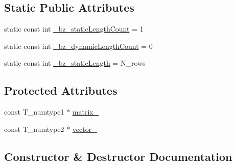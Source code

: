 \subsection*{Static Public Attributes}
\begin{DoxyCompactItemize}
\item 
static const int \hyperlink{class__bz__tinyMatrixVectorProduct_a15cc23ca89326eb0df99a66afdb37532}{\+\_\+bz\+\_\+static\+Length\+Count} = 1
\item 
static const int \hyperlink{class__bz__tinyMatrixVectorProduct_a09adf6f8290e78ec56ddffa97de2a7e0}{\+\_\+bz\+\_\+dynamic\+Length\+Count} = 0
\item 
static const int \hyperlink{class__bz__tinyMatrixVectorProduct_a9b189cec2a5d1f923f73480e6100edff}{\+\_\+bz\+\_\+static\+Length} = N\+\_\+rows
\end{DoxyCompactItemize}
\subsection*{Protected Attributes}
\begin{DoxyCompactItemize}
\item 
const T\+\_\+numtype1 $\ast$ \hyperlink{class__bz__tinyMatrixVectorProduct_a0da5a156f008517b588fc17334754eef}{matrix\+\_\+}
\item 
const T\+\_\+numtype2 $\ast$ \hyperlink{class__bz__tinyMatrixVectorProduct_ab9bddf4fc7e8522519e5c1987d055235}{vector\+\_\+}
\end{DoxyCompactItemize}


\subsection{Constructor \& Destructor Documentation}
\hypertarget{class__bz__tinyMatrixVectorProduct_a953bb2553da3325265d240807bcfdfb0}{}
